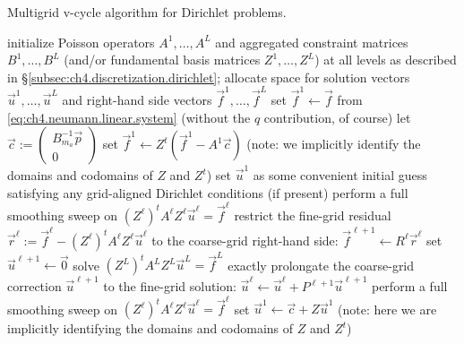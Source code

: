 \begin{algorithm}[htbp]
\caption{Multigrid v-cycle algorithm for Dirichlet problems.}
\label{alg:ch4.multigrid.dirichlet.vcycle}
\begin{algorithmic}[1]
\STATE initialize Poisson operators $A^1, \dotsc, A^L$ and aggregated constraint matrices $B^1, \dotsc, B^L$ (and/or fundamental basis matrices $Z^1, \dotsc, Z^L$) at all levels as described in \S\ref{subsec:ch4.discretization.dirichlet}; allocate space for solution vectors $\vec{u}^1, \dotsc, \vec{u}^L$ and right-hand side vectors $\vec{f}^1, \dotsc, \vec{f}^L$
\STATE set $\vec{f}^1 \leftarrow \vec{f}$ from \eqref{eq:ch4.neumann.linear.system} (without the $q$ contribution, of course)
\STATE let $\vec{c} := \begin{pmatrix} B_{m_a}^{-1} \vec{p} \\ 0 \end{pmatrix}$ 
\STATE set $\vec{f}^1 \leftarrow Z^t \left( \vec{f}^1 - A^1 \vec{c} \right)$ (note: we implicitly identify the domains and codomains of $Z$ and $Z^t$)
\STATE set $\vec{u}^1$ as some convenient initial guess satisfying any grid-aligned Dirichlet conditions (if present)
    \STATE perform a full smoothing sweep on $(Z^{\ell})^t A^{\ell} Z^{\ell} \vec{u}^{\ell} = \vec{f}^{\ell}$ 
    \STATE restrict the fine-grid residual $\vec{r}^{\ell} := \vec{f}^{\ell} - (Z^{\ell})^t A^{\ell} Z^{\ell} \vec{u}^{\ell}$ to the coarse-grid right-hand side: $\vec{f}^{\ell+1} \leftarrow R^{\ell} \vec{r}^{\ell}$ 
    \STATE set $\vec{u}^{\ell+1} \leftarrow \vec{0}$
\ENDFOR
\STATE solve $(Z^L)^t A^L Z^L \vec{u}^L = \vec{f}^L$ exactly 
    \STATE prolongate the coarse-grid correction $\vec{u}^{\ell+1}$ to the fine-grid solution: $\vec{u}^{\ell} \leftarrow \vec{u}^{\ell} + P^{\ell+1} \vec{u}^{\ell+1}$ 
    \STATE perform a full smoothing sweep on $(Z^{\ell})^t A^{\ell} Z^{\ell} \vec{u}^{\ell} = \vec{f}^{\ell}$ 
\ENDFOR
\STATE set $\vec{u}^1 \leftarrow \vec{c} + Z \vec{u}^1$ (note: here we are implicitly identifying the domains and codomains of $Z$ and $Z^t$)
\end{algorithmic}
\end{algorithm}

